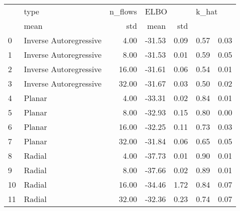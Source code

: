 \begin{tabular}{llrrrrr}
\toprule
{} &                    type & n\_flows & \multicolumn{2}{l}{ELBO} & \multicolumn{2}{l}{k\_hat} \\
{} &   mean &  std &  mean &  std \\
\midrule
0  &  Inverse Autoregressive &    4.00 & -31.53 & 0.09 &  0.57 & 0.03 \\
1  &  Inverse Autoregressive &    8.00 & -31.53 & 0.01 &  0.59 & 0.05 \\
2  &  Inverse Autoregressive &   16.00 & -31.61 & 0.06 &  0.54 & 0.01 \\
3  &  Inverse Autoregressive &   32.00 & -31.67 & 0.03 &  0.50 & 0.02 \\
4  &                  Planar &    4.00 & -33.31 & 0.02 &  0.84 & 0.01 \\
5  &                  Planar &    8.00 & -32.93 & 0.15 &  0.80 & 0.00 \\
6  &                  Planar &   16.00 & -32.25 & 0.11 &  0.73 & 0.03 \\
7  &                  Planar &   32.00 & -31.84 & 0.06 &  0.65 & 0.05 \\
8  &                  Radial &    4.00 & -37.73 & 0.01 &  0.90 & 0.01 \\
9  &                  Radial &    8.00 & -37.66 & 0.02 &  0.89 & 0.01 \\
10 &                  Radial &   16.00 & -34.46 & 1.72 &  0.84 & 0.07 \\
11 &                  Radial &   32.00 & -32.36 & 0.23 &  0.74 & 0.07 \\
\bottomrule
\end{tabular}
